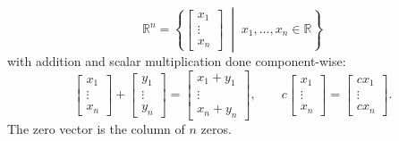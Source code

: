 \begin{definition}
\[
\mathbb{R}^n = \left\{ \begin{bmatrix} x_1 \\ \vdots \\ x_n \end{bmatrix} \;\middle|\; x_1, \dots, x_n \in \mathbb{R} \right\}
\]
with addition and scalar multiplication done component-wise:
\[
\begin{bmatrix} x_1 \\ \vdots \\ x_n \end{bmatrix} + \begin{bmatrix} y_1 \\ \vdots \\ y_n \end{bmatrix} = \begin{bmatrix} x_1 + y_1 \\ \vdots \\ x_n + y_n \end{bmatrix},
\qquad
c\begin{bmatrix} x_1 \\ \vdots \\ x_n \end{bmatrix} = \begin{bmatrix} cx_1 \\ \vdots \\ cx_n \end{bmatrix}.
\]
The zero vector is the column of $n$ zeros.
\end{definition}

